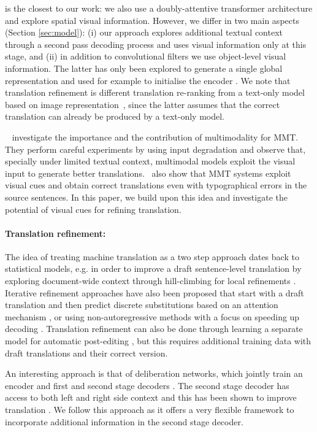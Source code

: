\documentclass[11pt,a4paper]{article}
\begin{document}
 is the closest to our work: we also use a doubly-attentive transformer architecture and explore spatial visual information. However, we differ in two main aspects (Section \ref{sec:model}): (i) our approach explores additional textual context through a second pass decoding process and uses visual information only at this stage, and (ii) in addition to convolutional filters we use  object-level visual information. The latter has only been explored to generate a single global representation \cite{GronroosEtAl:2018} and used for example to initialise the encoder \cite{HuangEtAl:2016}.
We note that translation refinement is different translation re-ranking from a text-only model based on image representation~\cite{ShahEtAl:2016,HitschlerEtAl:2016,lala-EtAl:2018:WMT}, since the latter assumes that the correct translation can already be produced by a text-only model.  

~\citet{caglayan2019probing} investigate the importance and the contribution of multimodality for MMT. They perform careful experiments by using input degradation and observe that, specially under limited textual context, multimodal models exploit the visual input to generate better translations.~\citet{caglayan2019probing} also show that MMT systems exploit visual cues and obtain correct translations even with typographical errors in the source sentences. In this paper, we build upon this idea and investigate the potential of visual cues for refining translation.

\paragraph{Translation refinement:} The idea of treating machine translation as a two step approach dates back to statistical models, e.g. in order to improve a draft sentence-level translation by exploring document-wide context through hill-climbing for local refinements \cite{D12-1108}. Iterative refinement approaches have also been proposed that start with a draft translation and then predict discrete substitutions based on an attention mechanism 
 \cite{DBLP:journals/corr/NovakAG16}, or using non-autoregressive methods with a focus on speeding up decoding \cite{D18-1149}. Translation refinement can also be done through learning a separate model for automatic post-editing \cite{C16-1172,I17-1013,chatterjee-EtAl:2018:WMT}, but this requires additional training data with draft translations and their correct version.

An interesting approach is that of deliberation networks, which jointly train an encoder and first and second stage decoders \cite{xia2017deliberation}. The second stage decoder has access to both left and right side context and this has been shown to improve translation \cite{xia2017deliberation,hassan2018achieving}. We follow this approach as it offers a very flexible framework to incorporate additional information in the second stage decoder.
\end{document}
